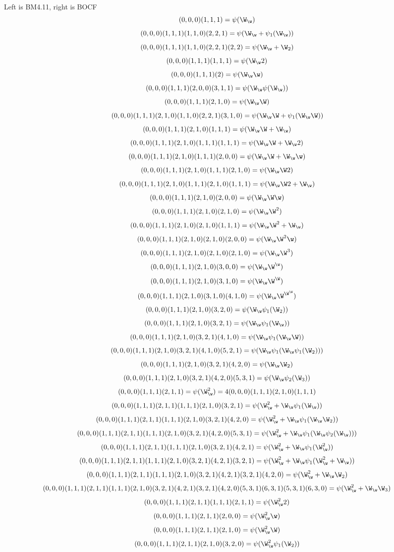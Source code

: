 Left is BM4.11, right is BOCF
\[(0,0,0)(1,1,1)=\psi(\W_\w)\]
\[(0,0,0)(1,1,1)(1,1,0)(2,2,1)=\psi(\W_\w + \psi_1(\W_\w))\]
\[(0,0,0)(1,1,1)(1,1,0)(2,2,1)(2,2)=\psi(\W_\w + \W_2)\]
\[(0,0,0)(1,1,1)(1,1,1)=\psi(\W_\w 2)\]
\[(0,0,0)(1,1,1)(2)=\psi(\W_\w \w)\]
\[(0,0,0)(1,1,1)(2,0,0)(3,1,1) = \psi(\W_\w \psi(\W_\w))\]
\[(0,0,0)(1,1,1)(2,1,0) = \psi(\W_\w \W)\]
\[(0,0,0)(1,1,1)(2,1,0)(1,1,0)(2,2,1)(3,1,0) = \psi(\W_\w \W+\psi_1(\W_\w \W))\]
\[(0,0,0)(1,1,1)(2,1,0)(1,1,1) = \psi(\W_\w \W+\W_\w)\]
\[(0,0,0)(1,1,1)(2,1,0)(1,1,1)(1,1,1) = \psi(\W_\w \W + \W_\w 2)\]
\[(0,0,0)(1,1,1)(2,1,0)(1,1,1)(2,0,0)=\psi(\W_\w \W + \W_\w \w)\]
\[(0,0,0)(1,1,1)(2,1,0)(1,1,1)(2,1,0)=\psi(\W_\w \W 2)\]
\[(0,0,0)(1,1,1)(2,1,0)(1,1,1)(2,1,0)(1,1,1)=\psi(\W_\w \W 2 + \W_\w)\]
\[(0,0,0)(1,1,1)(2,1,0)(2,0,0)=\psi(\W_\w \W \w)\]
\[(0,0,0)(1,1,1)(2,1,0)(2,1,0)=\psi(\W_\w \W^2)\]
\[(0,0,0)(1,1,1)(2,1,0)(2,1,0)(1,1,1)=\psi(\W_\w \W^2 + \W_\w)\]
\[(0,0,0)(1,1,1)(2,1,0)(2,1,0)(2,0,0)=\psi(\W_\w \W^2\w)\]
\[(0,0,0)(1,1,1)(2,1,0)(2,1,0)(2,1,0)=\psi(\W_\w \W^3)\]
\[(0,0,0)(1,1,1)(2,1,0)(3,0,0)=\psi(\W_\w \W^\w)\]
\[(0,0,0)(1,1,1)(2,1,0)(3,1,0)=\psi(\W_\w \W^\W)\]
\[(0,0,0)(1,1,1)(2,1,0)(3,1,0)(4,1,0)=\psi(\W_\w \W^{\W^\W})\]
\[(0,0,0)(1,1,1)(2,1,0)(3,2,0)=\psi(\W_\w \psi_1(\W_2))\]
\[(0,0,0)(1,1,1)(2,1,0)(3,2,1) = \psi(\W_\w\psi_1(\W_\w))\]
\[(0,0,0)(1,1,1)(2,1,0)(3,2,1)(4,1,0) = \psi(\W_\w\psi_1(\W_\w \W))\]
\[(0,0,0)(1,1,1)(2,1,0)(3,2,1)(4,1,0)(5,2,1) = \psi(\W_\w\psi_1(\W_\w\psi_1(\W_2)))\]
\[(0,0,0)(1,1,1)(2,1,0)(3,2,1)(4,2,0) = \psi(\W_\w\W_2)\]
\[(0,0,0)(1,1,1)(2,1,0)(3,2,1)(4,2,0)(5,3,1) = \psi(\W_\w\psi_2(\W_3))\]
\[(0,0,0)(1,1,1)(2,1,1) = \psi(\W_\w^2) = 4(0,0,0)(1,1,1)(2,1,0)(1,1,1)\]
\[(0,0,0)(1,1,1)(2,1,1)(1,1,1)(2,1,0)(3,2,1) = \psi(\W_\w^2+\W_\w\psi_1(\W_\w))\]
\[(0,0,0)(1,1,1)(2,1,1)(1,1,1)(2,1,0)(3,2,1)(4,2,0) = \psi(\W_\w^2+\W_\w\psi_1(\W_\w\W_2))\]
\[(0,0,0)(1,1,1)(2,1,1)(1,1,1)(2,1,0)(3,2,1)(4,2,0)(5,3,1) = \psi(\W_\w^2+\W_\w\psi_1(\W_\w\psi_2(\W_\w)))\]
\[(0,0,0)(1,1,1)(2,1,1)(1,1,1)(2,1,0)(3,2,1)(4,2,1) = \psi(\W_\w^2+\W_\w\psi_1(\W_\w^2))\]
\[(0,0,0)(1,1,1)(2,1,1)(1,1,1)(2,1,0)(3,2,1)(4,2,1)(3,2,1) = \psi(\W_\w^2+\W_\w\psi_1(\W_\w^2+\W_\w))\]
\[(0,0,0)(1,1,1)(2,1,1)(1,1,1)(2,1,0)(3,2,1)(4,2,1)(3,2,1)(4,2,0) = \psi(\W_\w^2+\W_\w\W_2)\]
\[(0,0,0)(1,1,1)(2,1,1)(1,1,1)(2,1,0)(3,2,1)(4,2,1)(3,2,1)(4,2,0)(5,3,1)(6,3,1)(5,3,1)(6,3,0) = \psi(\W_\w^2+\W_\w\W_3)\]
\[(0,0,0)(1,1,1)(2,1,1)(1,1,1)(2,1,1) = \psi(\W_\w^2 2)\]
\[(0,0,0)(1,1,1)(2,1,1)(2,0,0) = \psi(\W_\w^2 \w)\]
\[(0,0,0)(1,1,1)(2,1,1)(2,1,0) = \psi(\W_\w^2 \W)\]
\[(0,0,0)(1,1,1)(2,1,1)(2,1,0)(3,2,0) = \psi(\W_\w^2 \psi_1(\W_2))\]
